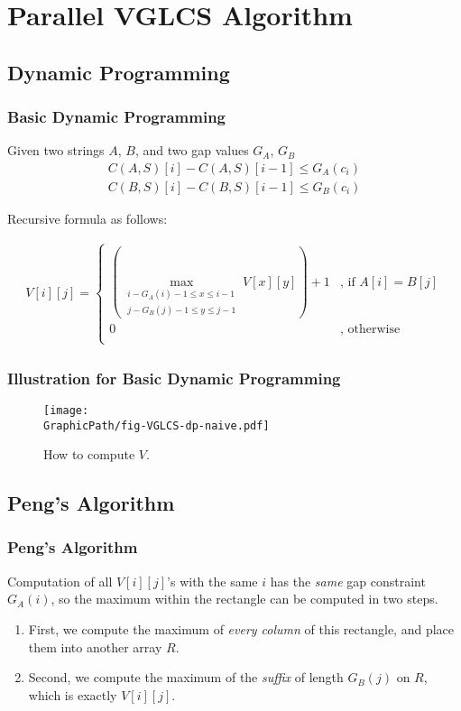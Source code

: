 \section{Parallel VGLCS Algorithm}

\subsection{Dynamic Programming}
\begin{frame}
    \frametitle{Basic Dynamic Programming}
	Given two strings $A$, $B$, and two gap values $G_{A}$, $G_{B}$
	\begin{align*}
        C(A, S)[i] - C(A, S)[i-1] \le G_{A}(c_i) \\
        C(B, S)[i] - C(B, S)[i-1] \le G_{B}(c_i)
    \end{align*}	

    Recursive formula as follows:

    \begin{align*}
    	V[i][j] = \left\{\begin{matrix}
 			(\max\limits_{
 				\substack{i-G_A(i)-1 \le x \le i-1 \\ 
 						  j-G_B(j)-1 \le y \le j-1}} 
 				V[x][y])+1
 				& \text{, if } A[i] = B[j] \\
 				0 & \text{, otherwise}\\
			\end{matrix}\right.
    \end{align*}
\end{frame}

\begin{frame}
    \frametitle{Illustration for Basic Dynamic Programming}
	\begin{figure}[!thb]
		\texttt{[image: \\GraphicPath/fig-VGLCS-dp-naive.pdf]}
		\caption{How to compute $V$.}
		\label{fig:basic-dp-VGLCS}
	\end{figure}
\end{frame}

\subsection{Peng's Algorithm}
\begin{frame}
    \frametitle{Peng's Algorithm}
   	Computation of all $V[i][j]$'s with the same $i$ has the {\em same}
	gap constraint $G_A(i)$, so the maximum within the rectangle can be
	computed in two steps.

    \begin{enumerate}
    	\setlength\itemsep{1em}
    	\item 
    		First, we compute the maximum of {\em every column} of this
			rectangle, and place them into another array $R$.
		\item 
			Second, we compute the maximum of the {\em suffix} of length
			$G_B(j)$ on $R$, which is exactly $V[i][j]$.
    \end{enumerate}
\end{frame}

